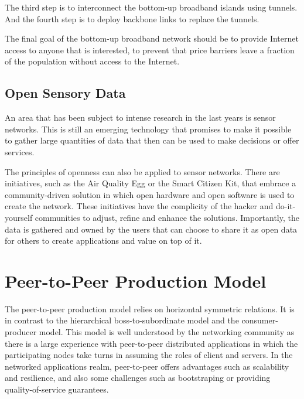 \documentclass[journal]{IEEEtran}
\begin{document}
The third step is to interconnect the bottom-up broadband islands using tunnels.
And the fourth step is to deploy backbone links to replace the tunnels.

The final goal of the bottom-up broadband network should be to provide Internet access to anyone that is interested, to prevent that price barriers leave a fraction of the population without access to the Internet.


\subsection{Open Sensory Data}

An area that has been subject to intense research in the last years is sensor networks.
This is still an emerging technology that promises to make it possible to gather large quantities of data that then can be used to make decisions or offer services.

The principles of openness can also be applied to sensor networks.
There are initiatives, such as the Air Quality Egg or the Smart Citizen Kit, that embrace a community-driven solution in which open hardware and open software is used to create the network.
These initiatives have the complicity of the hacker and do-it-yourself communities to adjust, refine and enhance the solutions.
Importantly, the data is gathered and owned by the users that can choose to share it as open data for others to create applications and value on top of it.


\section{Peer-to-Peer Production Model}
The peer-to-peer production model \cite{bauwens2009class} relies on horizontal symmetric relations.
It is in contrast to the hierarchical boss-to-subordinate model and the consumer-producer model.
This model is well understood by the networking community as there is a large experience with peer-to-peer distributed applications in which the participating nodes take turns in assuming the roles of client and servers.
In the networked applications realm, peer-to-peer offers advantages such as scalability and resilience, and also some challenges such as bootstraping or providing quality-of-service guarantees.
\end{document}
